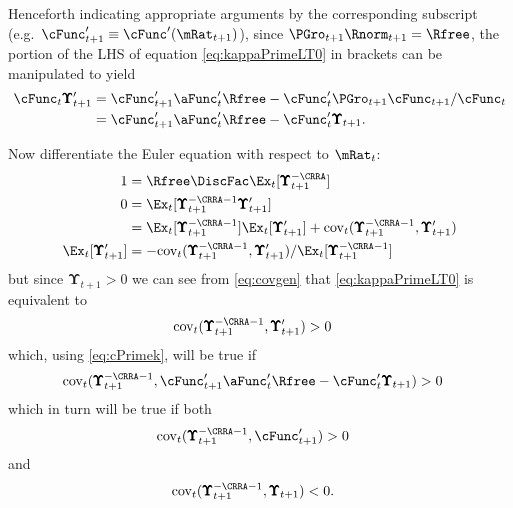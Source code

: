 \documentclass[BufferStockTheory]{subfiles}
\begin{document}
Henceforth indicating appropriate arguments by the corresponding
subscript (e.g.\ $\cFunc_{t+1}^{\prime} \equiv \cFunc^{\prime}(\mRat_{t+1})$), since
$\PGro_{t+1}\Rnorm_{t+1}=\Rfree$, the portion of the LHS of equation \eqref{eq:kappaPrimeLT0} in brackets can be manipulated to yield
\begin{align}
  \cFunc_{t} \pmb{\Upsilon}^{\prime}_{t+1}  & = \cFunc^{\prime}_{t+1}\aFunc^{\prime}_{t}\Rfree-\cFunc^{\prime}_{t} \PGro_{t+1} \cFunc_{t+1}/\cFunc_{t} \nonumber
  \\  & = \cFunc^{\prime}_{t+1}\aFunc^{\prime}_{t}\Rfree-\cFunc^{\prime}_{t} \pmb{\Upsilon}_{t+1} \label{eq:cPrimek}
        .
\end{align}

Now differentiate the Euler equation with respect to $\mRat_{t}$:
\begin{align}
  1  & = \Rfree \DiscFac \Ex_{t}[ \pmb{\Upsilon}_{t+1}^{-\CRRA}] \notag
  \\ 0  & = \Ex_{t}[\pmb{\Upsilon}_{t+1}^{-\CRRA-1} \pmb{\Upsilon}_{t+1}^{\prime}] \notag
  \\  & = \Ex_{t}[\pmb{\Upsilon}_{t+1}^{-\CRRA-1}]\Ex_{t}[\pmb{\Upsilon}_{t+1}^{\prime}]+\mbox{cov}_{t}(\pmb{\Upsilon}_{t+1}^{-\CRRA-1},\pmb{\Upsilon}_{t+1}^{\prime}) \notag
  \\ \Ex_{t}[\pmb{\Upsilon}_{t+1}^{\prime}]  & = -\mbox{cov}_{t}(\pmb{\Upsilon}_{t+1}^{-\CRRA-1},\pmb{\Upsilon}_{t+1}^{\prime})/\Ex_{t}[\pmb{\Upsilon}_{t+1}^{-\CRRA-1}] \label{eq:covgen}
\end{align}
but since $\pmb{\Upsilon}_{t+1} > 0$ we can see from \eqref{eq:covgen} that \eqref{eq:kappaPrimeLT0} is equivalent to
\begin{align}
  \mbox{cov}_{t}(\pmb{\Upsilon}_{t+1}^{-\CRRA-1},\pmb{\Upsilon}_{t+1}^{\prime})  & > 0 \nonumber
\end{align}
which, using \eqref{eq:cPrimek}, will be true if
\begin{align}
  \mbox{cov}_{t}(\pmb{\Upsilon}_{t+1}^{-\CRRA-1},\cFunc^{\prime}_{t+1}\aFunc^{\prime}_{t}\Rfree - \cFunc^{\prime}_{t}\pmb{\Upsilon}_{t+1})  & > 0 \notag
\end{align}
which in turn will be true if both
\begin{align}
  \mbox{cov}_{t}(\pmb{\Upsilon}_{t+1}^{-\CRRA-1},\cFunc^{\prime}_{t+1} )  & > 0 \notag
\end{align}
and
\begin{align*}
  \mbox{cov}_{t}(\pmb{\Upsilon}_{t+1}^{-\CRRA-1},\pmb{\Upsilon}_{t+1})  & < 0. \notag
\end{align*}
\end{document}

